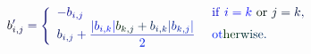 \documentclass[12pt]{article}
\begin{document}
\makeatletter
\renewcommand*{\@textcolor}[3]{%
  \protect\leavevmode
  \begingroup
    \color#1{#2}#3%
  \endgroup
}
\makeatother
\begin{displaymath}
\mathcolor[RGB]{0,0,15}{b} _ { \mathcolor[RGB]{0,0,30}{i} \mathcolor[RGB]{0,0,45}{,} \mathcolor[RGB]{0,0,60}{j} } ^ { \mathcolor[RGB]{0,0,75}{\prime} } \mathcolor[RGB]{0,0,90}{=} \mathcolor[RGB]{0,0,105}{\left\{} \begin{array} {ll} { \mathcolor[RGB]{0,0,120}{-} \mathcolor[RGB]{0,0,135}{b} _ { \mathcolor[RGB]{0,0,150}{i} \mathcolor[RGB]{0,0,165}{,} \mathcolor[RGB]{0,0,180}{j} } } & { \mathrm { ~ \mathcolor[RGB]{0,0,195}{i} \mathcolor[RGB]{0,0,210}{f} ~ } \mathcolor[RGB]{0,0,225}{i} \mathcolor[RGB]{0,0,240}{=} \mathcolor[RGB]{0,0,255}{k} \mathrm { ~ \mathcolor[RGB]{0,15,0}{o} \mathcolor[RGB]{0,15,15}{r} ~ } \mathcolor[RGB]{0,15,30}{j} \mathcolor[RGB]{0,15,45}{=} \mathcolor[RGB]{0,15,60}{k} \mathcolor[RGB]{0,15,75}{,} } \\ { \displaystyle \mathcolor[RGB]{0,15,90}{b} _ { \mathcolor[RGB]{0,15,105}{i} \mathcolor[RGB]{0,15,120}{,} \mathcolor[RGB]{0,15,135}{j} } \mathcolor[RGB]{0,15,150}{+} \mathcolor[RGB]{0,15,165}{\frac { \mathcolor[RGB]{0,15,180}{|} \mathcolor[RGB]{0,15,195}{b} _ { \mathcolor[RGB]{0,15,210}{i} \mathcolor[RGB]{0,15,225}{,} \mathcolor[RGB]{0,15,240}{k} } \mathcolor[RGB]{0,15,255}{|} \mathcolor[RGB]{0,30,0}{b} _ { \mathcolor[RGB]{0,30,15}{k} \mathcolor[RGB]{0,30,30}{,} \mathcolor[RGB]{0,30,45}{j} } \mathcolor[RGB]{0,30,60}{+} \mathcolor[RGB]{0,30,75}{b} _ { \mathcolor[RGB]{0,30,90}{i} \mathcolor[RGB]{0,30,105}{,} \mathcolor[RGB]{0,30,120}{k} } \mathcolor[RGB]{0,30,135}{|} \mathcolor[RGB]{0,30,150}{b} _ { \mathcolor[RGB]{0,30,165}{k} \mathcolor[RGB]{0,30,180}{,} \mathcolor[RGB]{0,30,195}{j} } \mathcolor[RGB]{0,30,210}{|} } { \mathcolor[RGB]{0,30,225}{2} } } } & { \mathrm { ~ \mathcolor[RGB]{0,30,240}{o} \mathcolor[RGB]{0,30,255}{t} \mathcolor[RGB]{0,45,0}{h} \mathcolor[RGB]{0,45,15}{e} \mathcolor[RGB]{0,45,30}{r} \mathcolor[RGB]{0,45,45}{w} \mathcolor[RGB]{0,45,60}{i} \mathcolor[RGB]{0,45,75}{s} \mathcolor[RGB]{0,45,90}{e} } \mathcolor[RGB]{0,45,105}{.} } \end{array} \mathcolor[RGB]{0,45,120}{\right.}
\end{displaymath}
\end{document}
